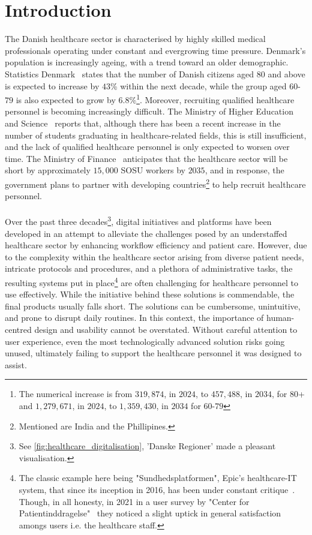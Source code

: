 \section{Introduction}
The Danish healthcare sector is characterised by highly skilled medical professionals operating under constant and evergrowing time pressure.
Denmark's population is increasingly ageing, with a trend toward an older demographic. Statistics Denmark~\cite{dst-older-pop} states that the number of Danish citizens aged $80$ and above is expected to increase by $43$\% within the next decade, while the group aged $60$-$79$ is also expected to grow by $6.8$\%\footnote{The numerical increase is from $319,874$, in $2024$, to $457,488$, in $2034$, for $80$+ and $1,279,671$, in $2024$, to $1,359,430$, in $2034$ for $60$-$79$}. Moreover, recruiting qualified healthcare personnel is becoming increasingly difficult. The Ministry of Higher Education and Science~\cite{MoHEaS-healthcare-rectruitment} reports that, although there has been a recent increase in the number of students graduating in healthcare-related fields, this is still insufficient, and the lack of qualified healthcare personnel is only expected to worsen over time. The Ministry of Finance~\cite{MoHEaS-healthcare-rectruitment} anticipates that the healthcare sector will be short by approximately $15,000$ SOSU workers by $2035$, and in response, the government plans to partner with developing countries\footnote{Mentioned are India and the Phillipines.} to help recruit healthcare personnel.
\\
\\
Over the past three decades\footnote{See \autoref{fig:healthcare_digitalisation}, 'Danske Regioner' made a pleasant visualisation.}, digital initiatives and platforms have been developed in an attempt to alleviate the challenges posed by an understaffed healthcare sector by enhancing workflow efficiency and patient care. However, due to the complexity within the healthcare sector arising from diverse patient needs, intricate protocols and procedures, and a plethora of administrative tasks, the resulting systems put in place\footnote{The classic example here being "Sundhedsplatformen", Epic's healthcare-IT system, that since its inception in 2016, has been under constant critique~\cite{DR-healthcare-platform, Altinget-healthcare-platform, TV2-healthcare-platform}. Though, in all honesty, in 2021 in a user survey by "Center for Patientinddragelse"~\cite{SP-user-survey} they noticed a slight uptick in general satisfaction amongs users i.e. the healthcare staff.} are often challenging for healthcare personnel to use effectively. While the initiative behind these solutions is commendable, the final products usually falls short. The solutions can be cumbersome, unintuitive, and prone to disrupt daily routines. In this context, the importance of human-centred design and usability cannot be overstated. Without careful attention to user experience, even the most technologically advanced solution risks going unused, ultimately failing to support the healthcare personnel it was designed to assist.
